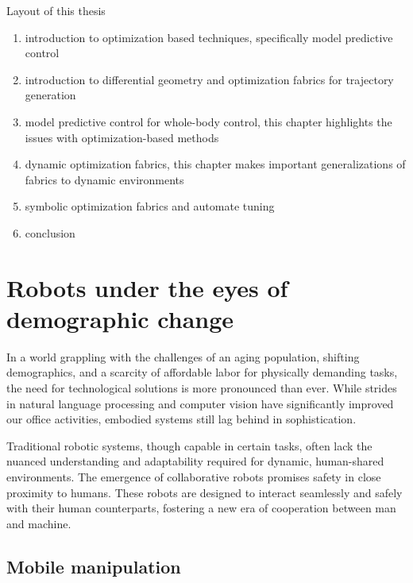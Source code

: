 Layout of this thesis
\begin{enumerate}
  \item introduction to optimization based techniques, specifically model
  predictive control
  \item introduction to differential geometry and optimization fabrics for
  trajectory generation
  \item model predictive control for whole-body control, this chapter highlights
  the issues with optimization-based methods
  \item dynamic optimization fabrics, this chapter makes important
  generalizations of fabrics to dynamic environments  
  \item symbolic optimization fabrics and automate tuning
  \item conclusion
\end{enumerate}

\section{Robots under the eyes of demographic change}

In a world grappling with the challenges of an aging population, shifting
demographics, and a scarcity of affordable labor for physically demanding tasks,
the need for technological solutions is more pronounced than ever. While
strides in natural language processing and computer vision have significantly
improved our office activities, embodied systems still
lag behind in sophistication.

Traditional robotic systems, though capable in certain tasks, often lack the
nuanced understanding and adaptability required for dynamic, human-shared
environments. The emergence of collaborative robots promises
safety in close proximity to humans. These robots are designed to interact
seamlessly and safely with their human counterparts, fostering a new era of
cooperation between man and machine. 

\subsection{Mobile manipulation}


